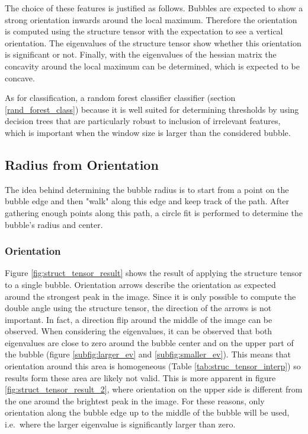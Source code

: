 		The choice of these features is justified as follows. Bubbles are expected to show a strong orientation inwards around the local maximum. Therefore the orientation is computed using the structure tensor with the expectation to see a vertical orientation. The eigenvalues of the structure tensor show whether this orientation is significant or not. Finally, with the eigenvalues of the hessian matrix the concavity around the local maximum can be determined, which is expected to be concave. 
		
		As for classification, a random forest classifier classifier (section \ref{rand_forest_class}) because it is well suited for determining thresholds by using decision trees that are particularly robust to inclusion of irrelevant features, which is important when the window size is larger than the considered bubble.
		
		
		
	
	\subsection{Radius from Orientation}\label{radius_from_orientation}
		The idea behind determining the bubble radius is to start from a point on the bubble edge and then "walk" along this edge and keep track of the path. After gathering enough points along this path, a circle fit is performed to determine the bubble's radius and center. 
		
		\subsubsection{Orientation}
		
		Figure \ref{fig:struct_tensor_result} shows the result of applying the structure tensor to a single bubble. Orientation arrows describe the orientation as expected around the strongest peak in the image. Since it is only possible to compute the double angle using the structure tensor, the direction of the arrows is not important. In fact, a direction flip around the middle of the image can be observed. When considering the eigenvalues, it can be observed that both eigenvalues are close to zero around the bubble center and on the upper part of the bubble (figure \ref{subfig:larger_ev} and \ref{subfig:smaller_ev}). 
		This means that orientation around this area is homogeneous (Table \ref{tab:struc_tensor_interp}) so results form these area are likely not valid. This is more apparent in figure \ref{fig:struct_tensor_result_2}, where orientation on the upper side is different from the one around the brightest peak in the image. For these reasons, only orientation along the bubble edge up to the middle of the bubble will be used, i.e.\ where the larger eigenvalue is significantly larger than zero.
		
